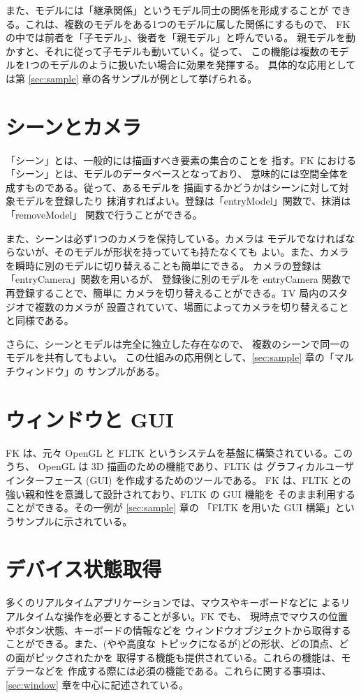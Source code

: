 また、モデルには「継承関係」というモデル同士の関係を形成することが
できる。これは、複数のモデルをある1つのモデルに属した関係にするもので、
FK の中では前者を「子モデル」、後者を「親モデル」と呼んでいる。
親モデルを動かすと、それに従って子モデルも動いていく。従って、
この機能は複数のモデルを1つのモデルのように扱いたい場合に効果を発揮する。
具体的な応用としては第 \ref{sec:sample} 章の各サンプルが例として挙げられる。

\section{シーンとカメラ}
「シーン」とは、一般的には描画すべき要素の集合のことを
指す。FK における「シーン」とは、モデルのデータベースとなっており、
意味的には空間全体を成すものである。従って、あるモデルを
描画するかどうかはシーンに対して対象モデルを登録したり
抹消すればよい。登録は「entryModel」関数で、抹消は「removeModel」
関数で行うことができる。

また、シーンは必ず1つのカメラを保持している。カメラは
モデルでなければならないが、そのモデルが形状を持っていても持たなくても
よい。また、カメラを瞬時に別のモデルに切り替えることも簡単にできる。
カメラの登録は「entryCamera」関数を用いるが、
登録後に別のモデルを entryCamera 関数で再登録することで、簡単に
カメラを切り替えることができる。TV 局内のスタジオで複数のカメラが
設置されていて、場面によってカメラを切り替えることと同様である。

さらに、シーンとモデルは完全に独立した存在なので、
複数のシーンで同一のモデルを共有してもよい。
この仕組みの応用例として、\ref{sec:sample} 章の「マルチウィンドウ」の
サンプルがある。

\section{ウィンドウと GUI}
FK は、元々 OpenGL と FLTK というシステムを基盤に構築されている。このうち、
OpenGL は 3D 描画のための機能であり、FLTK は
グラフィカルユーザインターフェース (GUI) を作成するためのツールである。
FK は、FLTK との強い親和性を意識して設計されており、FLTK の GUI 機能を
そのまま利用することができる。その一例が \ref{sec:sample} 章の
「FLTK を用いた GUI 構築」というサンプルに示されている。

\section{デバイス状態取得}
多くのリアルタイムアプリケーションでは、マウスやキーボードなどに
よるリアルタイムな操作を必要とすることが多い。FK でも、
現時点でマウスの位置やボタン状態、キーボードの情報などを
ウィンドウオブジェクトから取得することができる。また、(やや高度な
トピックになるが)どの形状、どの頂点、どの面がピックされたかを
取得する機能も提供されている。これらの機能は、モデラーなどを
作成する際には必須の機能である。これらに関する事項は、
\ref{sec:window} 章を中心に記述されている。

